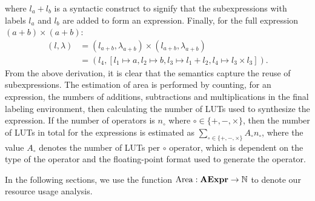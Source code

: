 where $l_a + l_b$ is a syntactic construct to signify that the subexpressions
with labels $l_a$ and $l_b$ are added to form an expression.
Finally, for the full expression $(a + b) \times (a + b)$:
\begin{equation}
    \begin{aligned}
        (l, \lambda)
            &= (l_{a + b}, \lambda_{a + b}) \times
               (l_{a + b}, \lambda_{a + b}) \\
            &= (l_4, [l_1\mapsto{a}, l_2\mapsto{b},
                      l_3\mapsto{l_1 + l_2}, l_4\mapsto{l_3 \times l_3}]).
    \end{aligned}
\end{equation}
From the above derivation, it is clear that the semantics capture the reuse
of subexpressions. The estimation of area is performed by counting, for an
expression, the numbers of additions, subtractions and multiplications in
the final labeling environment, then calculating the number of LUTs used to
synthesize the expression. If the number of operators is $n_\circ$ where
$\circ\in\{+,-,\times\}$, then the number of LUTs in total for the expressions
is estimated as $\sum_{\circ\in\{+,-,\times\}} A_\circ n_\circ$, where the
value $A_\circ$ denotes the number of LUTs per $\circ$ operator, which is
dependent on the type of the operator and the floating-point format used to
generate the operator.

In the following sections, we use the function $\operatorname{\mathrm{Area}}: \mathbf{AExpr}\to\mathbb{N}$
to denote our resource usage analysis.
